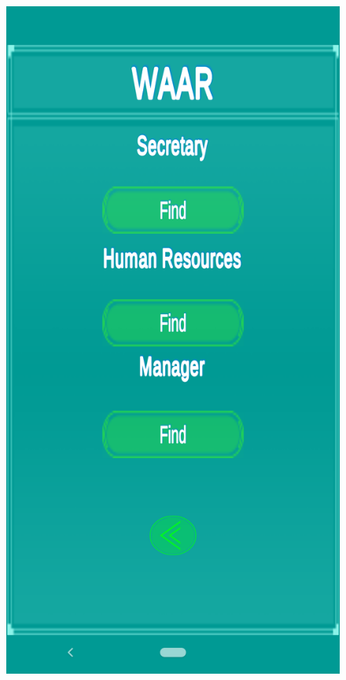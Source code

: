 \documentclass{aifyp}
\begin{document}
\begin{appendices}
\begin{figure}[H]
\begin{minipage}{.5\textwidth}
          \label{fig:InternsMenu}
        \end{minipage}%
        \begin{minipage}{.5\textwidth}
          \centering
          \includegraphics[scale=0.2]{Images/Chapter5/Impl19.png}

\end{minipage}
\end{figure}
\end{appendices}
\end{document}
